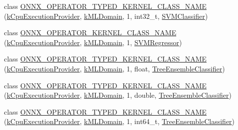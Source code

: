 \begin{DoxyCompactItemize}
\item 
class \mbox{\hyperlink{namespaceonnxruntime_1_1ml_a013c4a377c524c3ebbd7d452740001c0}{O\+N\+N\+X\+\_\+\+O\+P\+E\+R\+A\+T\+O\+R\+\_\+\+T\+Y\+P\+E\+D\+\_\+\+K\+E\+R\+N\+E\+L\+\_\+\+C\+L\+A\+S\+S\+\_\+\+N\+A\+ME}} (\mbox{\hyperlink{namespaceonnxruntime_a394a3c7e50622de1f203a96df592060d}{k\+Cpu\+Execution\+Provider}}, \mbox{\hyperlink{namespaceonnxruntime_a76df7dd63759039fc62486d6691e70e5}{k\+M\+L\+Domain}}, 1, int32\+\_\+t, \mbox{\hyperlink{classonnxruntime_1_1ml_1_1SVMClassifier}{S\+V\+M\+Classifier}})
\item 
class \mbox{\hyperlink{namespaceonnxruntime_1_1ml_af3c7afba6fc8faa316c8523a7d6c443e}{O\+N\+N\+X\+\_\+\+O\+P\+E\+R\+A\+T\+O\+R\+\_\+\+K\+E\+R\+N\+E\+L\+\_\+\+C\+L\+A\+S\+S\+\_\+\+N\+A\+ME}} (\mbox{\hyperlink{namespaceonnxruntime_a394a3c7e50622de1f203a96df592060d}{k\+Cpu\+Execution\+Provider}}, \mbox{\hyperlink{namespaceonnxruntime_a76df7dd63759039fc62486d6691e70e5}{k\+M\+L\+Domain}}, 1, \mbox{\hyperlink{classonnxruntime_1_1ml_1_1SVMRegressor}{S\+V\+M\+Regressor}})
\item 
class \mbox{\hyperlink{namespaceonnxruntime_1_1ml_af0b64ed16284c50318c32afa712f0fb3}{O\+N\+N\+X\+\_\+\+O\+P\+E\+R\+A\+T\+O\+R\+\_\+\+T\+Y\+P\+E\+D\+\_\+\+K\+E\+R\+N\+E\+L\+\_\+\+C\+L\+A\+S\+S\+\_\+\+N\+A\+ME}} (\mbox{\hyperlink{namespaceonnxruntime_a394a3c7e50622de1f203a96df592060d}{k\+Cpu\+Execution\+Provider}}, \mbox{\hyperlink{namespaceonnxruntime_a76df7dd63759039fc62486d6691e70e5}{k\+M\+L\+Domain}}, 1, float, \mbox{\hyperlink{classonnxruntime_1_1ml_1_1TreeEnsembleClassifier}{Tree\+Ensemble\+Classifier}})
\item 
class \mbox{\hyperlink{namespaceonnxruntime_1_1ml_a740e6beef268ec2b5d3a5336b3f6c970}{O\+N\+N\+X\+\_\+\+O\+P\+E\+R\+A\+T\+O\+R\+\_\+\+T\+Y\+P\+E\+D\+\_\+\+K\+E\+R\+N\+E\+L\+\_\+\+C\+L\+A\+S\+S\+\_\+\+N\+A\+ME}} (\mbox{\hyperlink{namespaceonnxruntime_a394a3c7e50622de1f203a96df592060d}{k\+Cpu\+Execution\+Provider}}, \mbox{\hyperlink{namespaceonnxruntime_a76df7dd63759039fc62486d6691e70e5}{k\+M\+L\+Domain}}, 1, double, \mbox{\hyperlink{classonnxruntime_1_1ml_1_1TreeEnsembleClassifier}{Tree\+Ensemble\+Classifier}})
\item 
class \mbox{\hyperlink{namespaceonnxruntime_1_1ml_ad8fa51ed3b91718363b52170315c4943}{O\+N\+N\+X\+\_\+\+O\+P\+E\+R\+A\+T\+O\+R\+\_\+\+T\+Y\+P\+E\+D\+\_\+\+K\+E\+R\+N\+E\+L\+\_\+\+C\+L\+A\+S\+S\+\_\+\+N\+A\+ME}} (\mbox{\hyperlink{namespaceonnxruntime_a394a3c7e50622de1f203a96df592060d}{k\+Cpu\+Execution\+Provider}}, \mbox{\hyperlink{namespaceonnxruntime_a76df7dd63759039fc62486d6691e70e5}{k\+M\+L\+Domain}}, 1, int64\+\_\+t, \mbox{\hyperlink{classonnxruntime_1_1ml_1_1TreeEnsembleClassifier}{Tree\+Ensemble\+Classifier}})

\end{DoxyCompactItemize}

